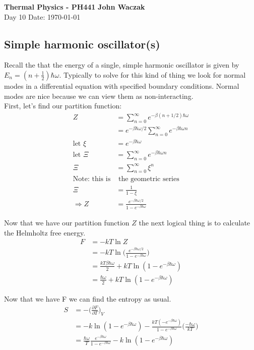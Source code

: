 \documentclass[a4paper, 11pt]{article}
\begin{document}
\noindent
\large\textbf{Thermal Physics - PH441} \hfill \textbf{John Waczak} \\
\normalsize Day 10 \hfill  Date: \today \\

\subsection*{Simple harmonic oscillator(s)}	
Recall the that the energy of a single, simple harmonic oscillator is given by $E_n = (n+\frac{1}{2})\hbar\omega$. Typically to solve for this kind of thing we look for normal modes in a differential equation with specified boundary conditions. Normal modes are nice because we can view them as non-interacting.	\\ 

\noindent First, let's find our partition function: 
	\begin{align*}
		Z 	&= \sum\limits_{n=0}^\infty e^{-\beta(n+1/2)\hbar\omega} \\ 
			&= e^{-\beta\hbar\omega/2}\sum\limits_{n=0}^\infty e^{-\beta \hbar \omega n}\\
		\text{let } \xi &= e^{-\beta\hbar\omega} \\ 
		\text{let } \Xi &= \sum\limits_{n=0}^\infty e^{-\beta\hbar\omega n}\\
			\Xi &= \sum\limits_{n=0}^\infty \xi^n \\ 
		\text{Note: this is}& \text{ the geometric series} \\ 
			\Xi &= \frac{1}{1-\xi} \\ 
		\Rightarrow Z &= \frac{e^{-\beta\hbar\omega/2}}{1-e^{-\beta \hbar \omega}}
	\end{align*}
	
\noindent Now that we have our partition function $Z$ the next logical thing is to calculate the Helmholtz free energy.
	\begin{align*}
		F &= -kT\ln Z \\ 
			&= -kT \ln \Big(\frac{e^{-\beta\hbar\omega/2}}{1-e^{-\beta \hbar \omega}}\Big) \\ 
			&= \frac{kT\beta\hbar\omega}{2}+kT\ln (1-e^{-\beta\hbar\omega}) \\
				&= \frac{\hbar\omega}{2}+kT\ln (1-e^{-\beta\hbar\omega})
	\end{align*}
	
\noindent Now that we have F we can find the entropy as usual. 
	\begin{align*}
		S 	&= -\Big(\frac{\partial F}{\partial T}\Big)_V\\
			&= -k\ln(1-e^{-\beta\hbar\omega})-\frac{kT(-e^{-\beta\hbar\omega})}{1-e^{-\beta\hbar\omega}}\Big(\frac{-\hbar\omega}{kT}\Big)\\
			&= \frac{\hbar\omega}{T}\frac{e^{-\beta\hbar\omega}}{1-e^{-\beta\hbar\omega}}-k\ln(1-e^{-\beta\hbar\omega})
	\end{align*}
	
\end{document}
